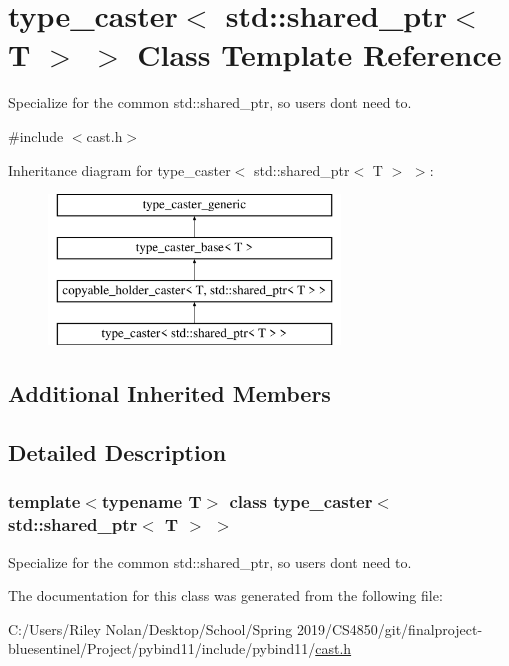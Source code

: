 \hypertarget{classtype__caster_3_01std_1_1shared__ptr_3_01_t_01_4_01_4}{}\section{type\+\_\+caster$<$ std\+::shared\+\_\+ptr$<$ T $>$ $>$ Class Template Reference}
\label{classtype__caster_3_01std_1_1shared__ptr_3_01_t_01_4_01_4}


Specialize for the common std\+::shared\+\_\+ptr, so users don\textquotesingle{}t need to.  




{\ttfamily \#include $<$cast.\+h$>$}

Inheritance diagram for type\+\_\+caster$<$ std\+::shared\+\_\+ptr$<$ T $>$ $>$\+:\begin{figure}[H]
\begin{center}
\leavevmode
\includegraphics[height=4.000000cm]{classtype__caster_3_01std_1_1shared__ptr_3_01_t_01_4_01_4}
\end{center}
\end{figure}
\subsection*{Additional Inherited Members}


\subsection{Detailed Description}
\subsubsection*{template$<$typename T$>$\newline
class type\+\_\+caster$<$ std\+::shared\+\_\+ptr$<$ T $>$ $>$}

Specialize for the common std\+::shared\+\_\+ptr, so users don\textquotesingle{}t need to. 

The documentation for this class was generated from the following file\+:\begin{DoxyCompactItemize}
\item 
C\+:/\+Users/\+Riley Nolan/\+Desktop/\+School/\+Spring 2019/\+C\+S4850/git/finalproject-\/bluesentinel/\+Project/pybind11/include/pybind11/\mbox{\hyperlink{cast_8h}{cast.\+h}}\end{DoxyCompactItemize}

